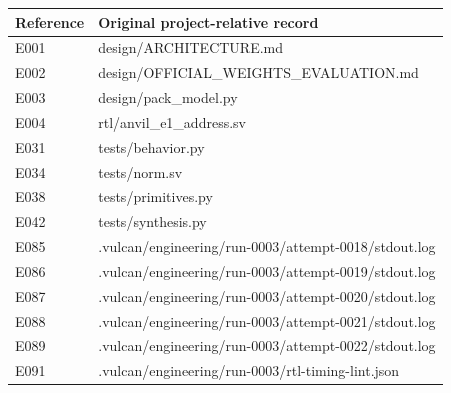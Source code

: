 \documentclass[11pt,a4paper]{article}
\begin{document}
{\small\renewcommand{\arraystretch}{1.18}\begin{longtable}{@{}L{0.12\textwidth}|L{0.82\textwidth}@{}}\toprule

\textbf{Reference} & \textbf{Original project-relative record}\\\midrule\endhead

E001 & design/\allowbreak{}ARCHITECTURE.md\\[2pt]\hline

E002 & design/\allowbreak{}OFFICIAL\_\allowbreak{}WEIGHTS\_\allowbreak{}EVALUATION.md\\[2pt]\hline

E003 & design/\allowbreak{}pack\_\allowbreak{}model.py\\[2pt]\hline

E004 & rtl/\allowbreak{}anvil\_\allowbreak{}e1\_\allowbreak{}address.sv\\[2pt]\hline

E031 & tests/\allowbreak{}behavior.py\\[2pt]\hline

E034 & tests/\allowbreak{}norm.sv\\[2pt]\hline

E038 & tests/\allowbreak{}primitives.py\\[2pt]\hline

E042 & tests/\allowbreak{}synthesis.py\\[2pt]\hline

E085 & .vulcan/\allowbreak{}engineering/\allowbreak{}run-0003/\allowbreak{}attempt-0018/\allowbreak{}stdout.log\\[2pt]\hline

E086 & .vulcan/\allowbreak{}engineering/\allowbreak{}run-0003/\allowbreak{}attempt-0019/\allowbreak{}stdout.log\\[2pt]\hline

E087 & .vulcan/\allowbreak{}engineering/\allowbreak{}run-0003/\allowbreak{}attempt-0020/\allowbreak{}stdout.log\\[2pt]\hline

E088 & .vulcan/\allowbreak{}engineering/\allowbreak{}run-0003/\allowbreak{}attempt-0021/\allowbreak{}stdout.log\\[2pt]\hline

E089 & .vulcan/\allowbreak{}engineering/\allowbreak{}run-0003/\allowbreak{}attempt-0022/\allowbreak{}stdout.log\\[2pt]\hline

E091 & .vulcan/\allowbreak{}engineering/\allowbreak{}run-0003/\allowbreak{}rtl-timing-lint.json\\[2pt]\hline


\end{longtable}}
\end{document}
